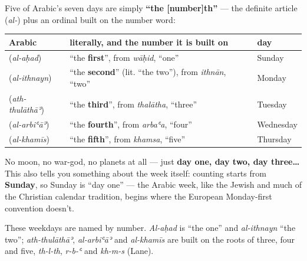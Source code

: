 \begin{grammarlens}[title={Grammar Lens — The pattern: definite article + ordinal number}]
Five of Arabic's seven days are simply \textbf{\textquotedblleft{}the {[}number{]}th\textquotedblright{}} — the definite article \textbf{} (\emph{al-}) plus an ordinal built on the number word:

\noindent
\begin{tabularx}{\linewidth}{@{}>{\raggedright\arraybackslash}X>{\raggedright\arraybackslash}X>{\raggedright\arraybackslash}X@{}}
\toprule
\textbf{Arabic} & \textbf{literally, and the number it is built on} & \textbf{day} \\
\midrule
\textbf{\ar{الأحد}} (\emph{al-aḥad}) & \textquotedblleft{}the \textbf{first}\textquotedblright{}, from \emph{wāḥid}, \textquotedblleft{}one\textquotedblright{} & Sunday \\
\textbf{\ar{الإثنين}} (\emph{al-ithnayn}) & \textquotedblleft{}the \textbf{second}\textquotedblright{} (lit. \textquotedblleft{}the two\textquotedblright{}), from \emph{ithnān}, \textquotedblleft{}two\textquotedblright{} & Monday \\
\textbf{\ar{الثلاثاء}} (\emph{ath-thulāthāʾ}) & \textquotedblleft{}the \textbf{third}\textquotedblright{}, from \emph{thalātha}, \textquotedblleft{}three\textquotedblright{} & Tuesday \\
\textbf{\ar{الأربعاء}} (\emph{al-arbiʿāʾ}) & \textquotedblleft{}the \textbf{fourth}\textquotedblright{}, from \emph{arbaʿa}, \textquotedblleft{}four\textquotedblright{} & Wednesday \\
\textbf{\ar{الخميس}} (\emph{al-khamīs}) & \textquotedblleft{}the \textbf{fifth}\textquotedblright{}, from \emph{khamsa}, \textquotedblleft{}five\textquotedblright{} & Thursday \\
\bottomrule
\end{tabularx}

No moon, no war-god, no planets at all — just \textbf{day one, day two, day three…} This also tells you something about the week itself: counting starts from \textbf{Sunday}, so Sunday is \textquotedblleft{}day one\textquotedblright{} — the Arabic week, like the Jewish and much of the Christian calendar tradition, begins where the European Monday-first convention doesn't.
\end{grammarlens}

\begin{cousinweb}
These weekdays are named by number. \emph{Al-aḥad} is \textquotedblleft{}the one\textquotedblright{} and \emph{al-ithnayn} \textquotedblleft{}the two\textquotedblright{}; \emph{ath-thulāthāʾ}, \emph{al-arbiʿāʾ} and \emph{al-khamīs} are built on the roots of three, four and five, \emph{th-l-th}, \emph{r-b-ʿ} and \emph{kh-m-s} (Lane).
\end{cousinweb}

